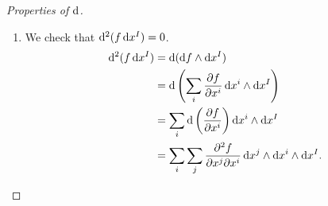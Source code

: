 \begin{proof}[Properties of $\mathop{}\!\mathrm{d}$]
  \begin{enumerate}
    \item{
      We check that
      $\mathop{}\!\mathrm{d}^2 (f \mathop{}\!\mathrm{d} x^I) = 0$.
      \begin{align*}
         \dif^2 (f \dif x^I)
      &= \dif (\dif f \wedge \dif x^I) \\
      &= \dif \left(
           \sum_i
             \frac{\partial f}{\partial x^i}
             \dif x^i \wedge \dif x^I
         \right) \\
      &= \sum_i
           \dif \left(
             \frac{\partial f}
                  {\partial x^i}
           \right)
           \dif x^i \wedge \dif x^I \\
      &= \sum_i
           \sum_j
             \frac{\partial^2 f}
                  {\partial x^j \partial x^i}
             \dif x^j \wedge \dif x^i \wedge \dif x^I.
      \end{align*}

}
\end{enumerate}
\end{proof}
